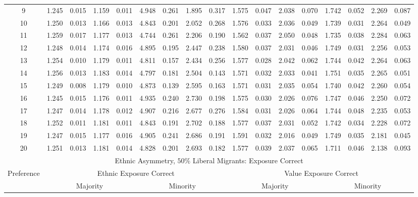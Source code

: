 \documentclass{article}
\begin{document}
\begin{table}[H]
{\begin{tabular}{|c|c|c|c|c|c|c|c|c|c|c|c|c|c|c|c|c|}
     9 & 1.245 & 0.015 & 1.159 & 0.011 & 4.948 & 0.261 & 1.895 & 0.317 & 1.575 & 0.047 & 2.038 & 0.070 & 1.742 & 0.052 & 2.269 & 0.087 \\ 
    10 & 1.250 & 0.013 & 1.166 & 0.013 & 4.843 & 0.201 & 2.052 & 0.268 & 1.576 & 0.033 & 2.036 & 0.049 & 1.739 & 0.031 & 2.264 & 0.049 \\ 
    11 & 1.259 & 0.017 & 1.177 & 0.013 & 4.744 & 0.261 & 2.206 & 0.190 & 1.562 & 0.037 & 2.050 & 0.048 & 1.735 & 0.038 & 2.284 & 0.063 \\ 
    12 & 1.248 & 0.014 & 1.174 & 0.016 & 4.895 & 0.195 & 2.447 & 0.238 & 1.580 & 0.037 & 2.031 & 0.046 & 1.749 & 0.031 & 2.256 & 0.053 \\ 
    13 & 1.254 & 0.010 & 1.179 & 0.011 & 4.811 & 0.157 & 2.434 & 0.256 & 1.577 & 0.028 & 2.042 & 0.062 & 1.744 & 0.042 & 2.264 & 0.063 \\ 
    14 & 1.256 & 0.013 & 1.183 & 0.014 & 4.797 & 0.181 & 2.504 & 0.143 & 1.571 & 0.032 & 2.033 & 0.041 & 1.751 & 0.035 & 2.265 & 0.051 \\ 
    15 & 1.249 & 0.008 & 1.179 & 0.010 & 4.873 & 0.139 & 2.595 & 0.163 & 1.571 & 0.031 & 2.035 & 0.054 & 1.740 & 0.042 & 2.260 & 0.054 \\ 
    16 & 1.245 & 0.015 & 1.176 & 0.011 & 4.935 & 0.240 & 2.730 & 0.198 & 1.575 & 0.030 & 2.026 & 0.076 & 1.747 & 0.046 & 2.250 & 0.072 \\ 
    17 & 1.247 & 0.014 & 1.178 & 0.012 & 4.907 & 0.216 & 2.677 & 0.276 & 1.584 & 0.031 & 2.026 & 0.064 & 1.744 & 0.048 & 2.235 & 0.053 \\ 
    18 & 1.252 & 0.011 & 1.181 & 0.011 & 4.843 & 0.191 & 2.702 & 0.188 & 1.577 & 0.037 & 2.031 & 0.052 & 1.742 & 0.034 & 2.228 & 0.072 \\ 
    19 & 1.247 & 0.015 & 1.177 & 0.016 & 4.905 & 0.241 & 2.686 & 0.191 & 1.591 & 0.032 & 2.016 & 0.049 & 1.749 & 0.035 & 2.181 & 0.045 \\ 
    20 & 1.251 & 0.013 & 1.181 & 0.014 & 4.828 & 0.201 & 2.693 & 0.182 & 1.577 & 0.039 & 2.037 & 0.065 & 1.711 & 0.046 & 2.138 & 0.093 \\ 
 \hline
  \multicolumn{17}{|c|}{Ethnic Asymmetry, $50 \%$ Liberal Migrants: Exposure Correct}  \\\hline
 Preference &  \multicolumn{8}{|c|}{Ethnic Exposure Correct} & \multicolumn{8}{|c|}{Value Exposure Correct}   \\\hline
 & \multicolumn{4}{|c|}{Majority} & \multicolumn{4}{|c|}{Minority}  & \multicolumn{4}{|c|}{Majority} & \multicolumn{4}{|c|}{Minority}  \\

\end{tabular}}
\end{table}
\end{document}
